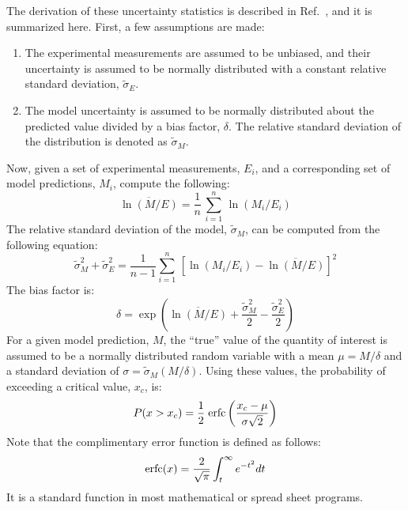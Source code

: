 \documentclass[graybox]{svmult}
\begin{document}
The derivation of these uncertainty statistics is described in Ref.~\cite{McGrattan:Metrologia}, and it is summarized here. First, a few assumptions are made:
\begin{enumerate}
\item The experimental measurements are assumed to be unbiased, and their uncertainty is assumed to be normally distributed with a constant relative standard deviation, $\widetilde{\sigma}_E$.
\item The model uncertainty is assumed to be normally distributed about the predicted value divided by a bias factor, $\delta$. The relative standard deviation of the distribution is denoted as $\widetilde{\sigma}_M$.
\end{enumerate}
Now, given a set of experimental measurements, $E_i$, and a corresponding set of model predictions, $M_i$, compute the following:
\begin{equation}
   \overline{\ln (M/E)} = \frac{1}{n} \, \sum_{i=1}^n \, \ln (M_i/E_i)
\end{equation}
The relative standard deviation of the model, $\widetilde{\sigma}_M$, can be computed from the following equation:
\begin{equation}
   \widetilde{\sigma}_M^2 + \widetilde{\sigma}_E^2 = \frac{1}{n-1} \sum_{i=1}^n \,
   \left[ \ln (M_i/E_i) - \overline{\ln (M/E)}  \right]^2 \label{stdev}
\end{equation}
The bias factor is:
\begin{equation}
   \delta = \exp \left( \overline{\ln (M/E)} + \frac{ \widetilde{\sigma}_M^2}{2}-\frac{\widetilde{\sigma}_E^2}{2} \right) \label{delta}
\end{equation}
For a given model prediction, $M$, the ``true'' value of the quantity of interest is assumed to be a normally distributed random variable with a mean $\mu=M/\delta$ and a standard deviation of $\sigma=\widetilde{\sigma}_M (M/\delta)$.
Using these values, the probability of exceeding a critical value, $x_c$, is:
\begin{equation}
   P(x>x_c) = \frac{1}{2} \; \hbox{erfc} \left( \frac{x_c-\mu}{\sigma \sqrt{2}} \right) \label{prob}
\end{equation}
Note that the complimentary error function is defined as follows:
\begin{equation}
   \hbox{erfc}(x) = \frac{2}{\sqrt{\pi}} \int_t^\infty e^{-t^2} dt
\end{equation}
It is a standard function in most mathematical or spread sheet programs.
\end{document}
